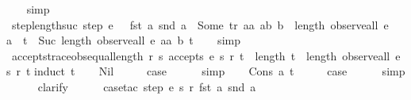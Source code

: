 \begin{isabellebody}
%
\isadelimproof
\ \ %
\endisadelimproof
%
\isatagproof
{}\isamarkupfalse%
\ simp%
\endisatagproof
{\isafoldproof}%
%
\isadelimproof
\isanewline
%
\endisadelimproof
\isanewline
{}\isamarkupfalse%
\ step{\isacharunderscore}length{\isacharunderscore}suc{\isacharcolon}\ {\isachardoublequoteopen}step\ e\ {}\ {\isacharless}{\isachargreater}\ {\isacharparenleft}fst\ a{\isacharparenright}\ {\isacharparenleft}snd\ a{\isacharparenright}\ {\isacharequal}\ Some\ {\isacharparenleft}tr{\isacharcomma}\ aa{\isacharcomma}\ ab{\isacharcomma}\ b{\isacharparenright}\ {\isasymLongrightarrow}\ length\ {\isacharparenleft}observe{\isacharunderscore}all\ e\ {}\ {\isacharless}{\isachargreater}\ {\isacharparenleft}a\ {\isacharhash}\ t{\isacharparenright}{\isacharparenright}\ {\isacharequal}\ Suc\ {\isacharparenleft}length\ {\isacharparenleft}observe{\isacharunderscore}all\ e\ aa\ b\ t{\isacharparenright}{\isacharparenright}{\isachardoublequoteclose}\isanewline
%
\isadelimproof
\ \ %
\endisadelimproof
%
\isatagproof
{}\isamarkupfalse%
\ simp%
\endisatagproof
{\isafoldproof}%
%
\isadelimproof
\isanewline
%
\endisadelimproof
\isanewline
{}\isamarkupfalse%
\ accepts{\isacharunderscore}trace{\isacharunderscore}obs{\isacharunderscore}equal{\isacharunderscore}length{\isacharcolon}\ {\isachardoublequoteopen}{\isasymforall}r\ s{\isachardot}\ accepts\ e\ s\ r\ t\ {\isasymlongrightarrow}\ {\isacharparenleft}length\ t\ {\isacharequal}\ length\ {\isacharparenleft}observe{\isacharunderscore}all\ e\ s\ r\ t{\isacharparenright}{\isacharparenright}{\isachardoublequoteclose}\isanewline
%
\isadelimproof
%
\endisadelimproof
%
\isatagproof
{}\isamarkupfalse%
{\isacharparenleft}induct\ t{\isacharparenright}\isanewline
\ \ \isamarkupfalse%
\ Nil\isanewline
\ \ \isamarkupfalse%
\ \isamarkupfalse%
\ {\isacharquery}case\isanewline
\ \ \ \ \isamarkupfalse%
\ simp\isanewline
{}\isamarkupfalse%
\isanewline
\ \ \isamarkupfalse%
\ {\isacharparenleft}Cons\ a\ t{\isacharparenright}\isanewline
\ \ \isamarkupfalse%
\ \isamarkupfalse%
\ {\isacharquery}case\isanewline
\ \ \ \ \isamarkupfalse%
\ simp\isanewline
\ \ \ \ \isamarkupfalse%
\ clarify\isanewline
\ \ \ \ \isamarkupfalse%
\ {\isacharparenleft}case{\isacharunderscore}tac\ {\isachardoublequoteopen}step\ e\ s\ r\ {\isacharparenleft}fst\ a{\isacharparenright}\ {\isacharparenleft}snd\ a{\isacharparenright}{\isachardoublequoteclose}{\isacharparenright}\isanewline

\end{isabellebody}
